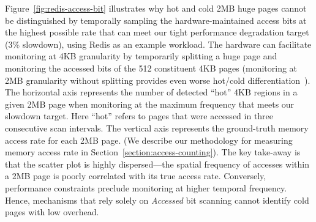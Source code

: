 Figure~\ref{fig:redis-access-bit} illustrates why hot and cold 2MB huge pages 
cannot be distinguished by temporally sampling
the hardware-maintained access bits at the highest possible rate that can meet
our tight performance degradation target (3\% slowdown), using Redis as an example workload.
The hardware can facilitate 
monitoring at 4KB granularity by temporarily splitting a huge page and monitoring
the accessed bits of the 512 constituent 4KB pages (monitoring at 2MB granularity
without splitting provides even worse hot/cold
differentiation~\cite{ref:Guo:2015:PBL:2731186.2731187}). The horizontal axis 
represents the number of detected ``hot'' 4KB regions
in a given 2MB page when monitoring at the maximum frequency that meets our slowdown target. Here
``hot'' refers to pages that were accessed in three consecutive scan intervals.
The vertical axis represents the ground-truth memory access rate for each 2MB page. 
(We describe our methodology for measuring memory access rate in
Section~\ref{section:access-counting}). 
The key take-away is that the scatter plot is highly dispersed---the spatial frequency
of accesses within a 2MB page is poorly correlated with its true access rate.
Conversely, performance constraints preclude monitoring at higher temporal
frequency. Hence, mechanisms that rely solely on {\it Accessed} bit scanning
cannot identify cold pages with low overhead.

